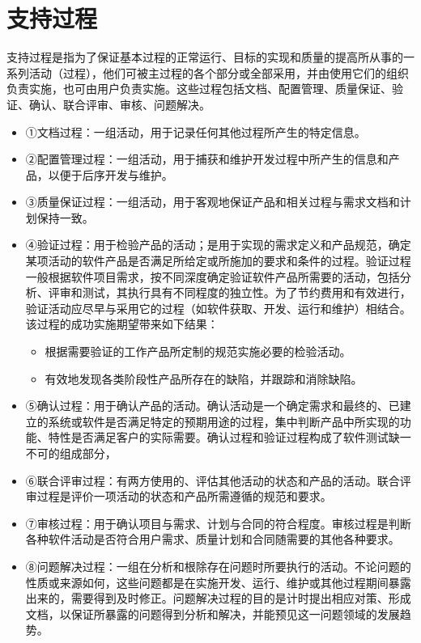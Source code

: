 \documentclass[UTF8,nofonts]{ctexart}
\begin{document}
\part{\textbf{支持过程}}
支持过程是指为了保证基本过程的正常运行、目标的实现和质量的提高所从事的一系列活动（过程），他们可被主过程的各个部分或全部采用，并由使用它们的组织负责实施，也可由用户负责实施。这些过程包括文档、配置管理、质量保证、验证、确认、联合评审、审核、问题解决。
\begin{itemize}
 \setlength{\itemsep}{0pt}
 \setlength{\parskip}{0pt}
 \setlength{\parsep}{0pt}
\item ①文档过程：一组活动，用于记录任何其他过程所产生的特定信息。
\item ②配置管理过程：一组活动，用于捕获和维护开发过程中所产生的信息和产品，以便于后序开发与维护。
\item ③质量保证过程：一组活动，用于客观地保证产品和相关过程与需求文档和计划保持一致。
\item ④验证过程：用于检验产品的活动；是用于实现的需求定义和产品规范，确定某项活动的软件产品是否满足所给定或所施加的要求和条件的过程。验证过程一般根据软件项目需求，按不同深度确定验证软件产品所需要的活动，包括分析、评审和测试，其执行具有不同程度的独立性。为了节约费用和有效进行，验证活动应尽早与采用它的过程（如软件获取、开发、运行和维护）相结合。该过程的成功实施期望带来如下结果：
\begin{itemize}
 \setlength{\itemsep}{0pt}
 \setlength{\parskip}{0pt}
 \setlength{\parsep}{0pt}
\item 根据需要验证的工作产品所定制的规范实施必要的检验活动。
\item 有效地发现各类阶段性产品所存在的缺陷，并跟踪和消除缺陷。
\end{itemize}
\item ⑤确认过程：用于确认产品的活动。确认活动是一个确定需求和最终的、已建立的系统或软件是否满足特定的预期用途的过程，集中判断产品中所实现的功能、特性是否满足客户的实际需要。确认过程和验证过程构成了软件测试缺一不可的组成部分，
\item ⑥联合评审过程：有两方使用的、评估其他活动的状态和产品的活动。联合评审过程是评价一项活动的状态和产品所需遵循的规范和要求。
\item ⑦审核过程：用于确认项目与需求、计划与合同的符合程度。审核过程是判断各种软件活动是否符合用户需求、质量计划和合同随需要的其他各种要求。
\item ⑧问题解决过程：一组在分析和根除存在问题时所要执行的活动。不论问题的性质或来源如何，这些问题都是在实施开发、运行、维护或其他过程期间暴露出来的，需要得到及时修正。问题解决过程的目的是计时提出相应对策、形成文档，以保证所暴露的问题得到分析和解决，并能预见这一问题领域的发展趋势。
\end{itemize}
\end{document}
